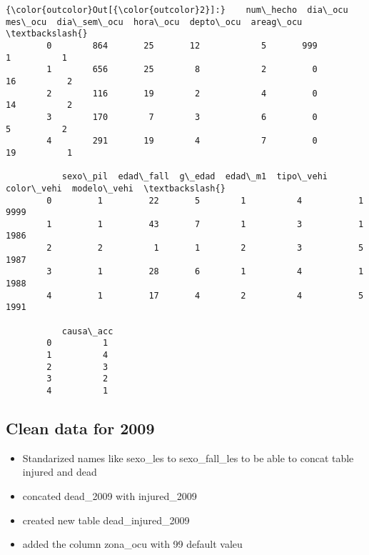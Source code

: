 \documentclass[11pt]{article}
\providecommand{\tightlist}{%
      \setlength{\itemsep}{0pt}\setlength{\parskip}{0pt}}
\begin{document}
\begin{Verbatim}[commandchars=\\\{\}]
{\color{outcolor}Out[{\color{outcolor}2}]:}    num\_hecho  dia\_ocu  mes\_ocu  dia\_sem\_ocu  hora\_ocu  depto\_ocu  areag\_ocu  \textbackslash{}
        0        864       25       12            5       999          1          1   
        1        656       25        8            2         0         16          2   
        2        116       19        2            4         0         14          2   
        3        170        7        3            6         0          5          2   
        4        291       19        4            7         0         19          1   
        
           sexo\_pil  edad\_fall  g\_edad  edad\_m1  tipo\_vehi  color\_vehi  modelo\_vehi  \textbackslash{}
        0         1         22       5        1          4           1         9999   
        1         1         43       7        1          3           1         1986   
        2         2          1       1        2          3           5         1987   
        3         1         28       6        1          4           1         1988   
        4         1         17       4        2          4           5         1991   
        
           causa\_acc  
        0          1  
        1          4  
        2          3  
        3          2  
        4          1  
\end{Verbatim}
            
    \hypertarget{clean-data-for-2009}{%
\subsection{Clean data for 2009}\label{clean-data-for-2009}}

\begin{itemize}
\tightlist
\item
  Standarized names like sexo\_les to sexo\_fall\_les to be able to
  concat table injured and dead
\item
  concated dead\_2009 with injured\_2009
\item
  created new table dead\_injured\_2009
\item
  added the column zona\_ocu with 99 default valeu
\end{itemize}
\end{document}
